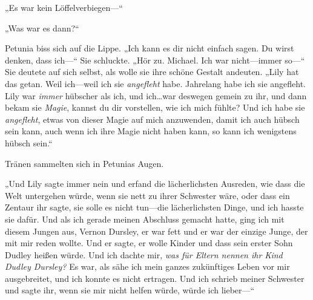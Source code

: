 „Es war kein Löffelverbiegen—“

„Was war es dann?“

Petunia biss sich auf die Lippe. „Ich kann es dir nicht einfach sagen. Du wirst denken, dass ich—“ Sie schluckte. „Hör zu. Michael. Ich war nicht—immer so—“ Sie deutete auf sich selbst, als wolle sie ihre schöne Gestalt andeuten. „Lily hat das getan. Weil ich—weil ich sie \emph{angefleht} habe. Jahrelang habe ich sie angefleht. Lily war \emph{immer} hübscher als ich, und ich…war deswegen gemein zu ihr, und dann bekam sie \emph{Magie}, kannst du dir vorstellen, wie ich mich fühlte? Und ich habe sie \emph{angefleht}, etwas von dieser Magie auf mich anzuwenden, damit ich auch hübsch sein kann, auch wenn ich ihre Magie nicht haben kann, so kann ich wenigstens hübsch sein.“

Tränen sammelten sich in Petunias Augen.

„Und Lily sagte immer nein und erfand die lächerlichsten Ausreden, wie dass die Welt untergehen würde, wenn sie nett zu ihrer Schwester wäre, oder dass ein Zentaur ihr sagte, sie solle es nicht tun—die lächerlichsten Dinge, und ich hasste sie dafür. Und als ich gerade meinen Abschluss gemacht hatte, ging ich mit diesem Jungen aus, Vernon Dursley, er war fett und er war der einzige Junge, der mit mir reden wollte. Und er sagte, er wolle Kinder und dass sein erster Sohn Dudley heißen würde. Und ich dachte mir, \emph{was für Eltern nennen ihr Kind Dudley Dursley?} Es war, als sähe ich mein ganzes zukünftiges Leben vor mir ausgebreitet, und ich konnte es nicht ertragen. Und ich schrieb meiner Schwester und sagte ihr, wenn sie mir nicht helfen würde, würde ich lieber—“

